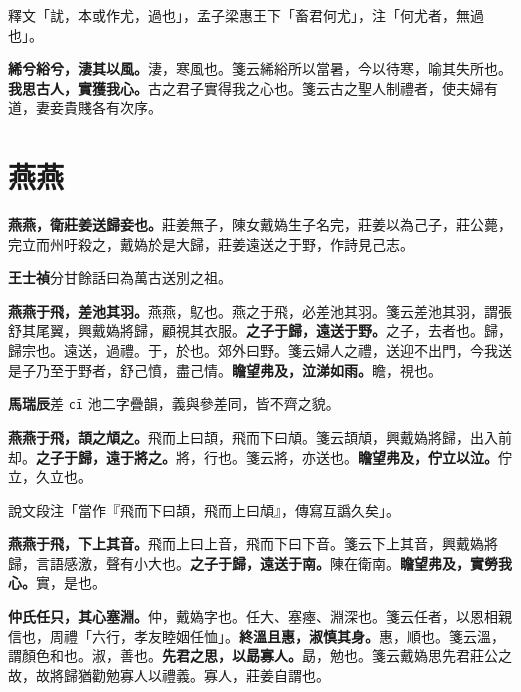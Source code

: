 \begin{quoting}釋文「訧，本或作尤，過也」，孟子梁惠王下「畜君何尤」，注「何尤者，無過也」。\end{quoting}

\textbf{絺兮綌兮，淒其以風。}{\footnotesize 淒，寒風也。箋云絺綌所以當暑，今以待寒，喻其失所也。}\textbf{我思古人，實獲我心。}{\footnotesize 古之君子實得我之心也。箋云古之聖人制禮者，使夫婦有道，妻妾貴賤各有次序。}

\section{燕燕}


\textbf{燕燕，衛莊姜送歸妾也。}{\footnotesize 莊姜無子，陳女戴媯生子名完，莊姜以為己子，莊公薨，完立而州吁殺之，戴媯於是大歸，莊姜遠送之于野，作詩見己志。}

\begin{quoting}\textbf{王士禎}分甘餘話曰為萬古送別之祖。\end{quoting}

\textbf{燕燕于飛，差池其羽。}{\footnotesize 燕燕，鳦也。燕之于飛，必差池其羽。箋云差池其羽，謂張舒其尾翼，興戴媯將歸，顧視其衣服。}\textbf{之子于歸，遠送于野。}{\footnotesize 之子，去者也。歸，歸宗也。遠送，過禮。于，於也。郊外曰野。箋云婦人之禮，送迎不出門，今我送是子乃至于野者，舒己憤，盡己情。}\textbf{瞻望弗及，泣涕如雨。}{\footnotesize 瞻，視也。}

\begin{quoting}\textbf{馬瑞辰}差 \texttt{cī} 池二字疊韻，義與參差同，皆不齊之貌。\end{quoting}

\textbf{燕燕于飛，頡之頏之。}{\footnotesize 飛而上曰頡，飛而下曰頏。箋云頡頏，興戴媯將歸，出入前却。}\textbf{之子于歸，遠于將之。}{\footnotesize 將，行也。箋云將，亦送也。}\textbf{瞻望弗及，佇立以泣。}{\footnotesize 佇立，久立也。}

\begin{quoting}說文段注「當作『飛而下曰頡，飛而上曰頏』，傳寫互譌久矣」。\end{quoting}

\textbf{燕燕于飛，下上其音。}{\footnotesize 飛而上曰上音，飛而下曰下音。箋云下上其音，興戴媯將歸，言語感激，聲有小大也。}\textbf{之子于歸，遠送于南。}{\footnotesize 陳在衛南。}\textbf{瞻望弗及，實勞我心。}{\footnotesize 實，是也。}

\textbf{仲氏任只，其心塞淵。}{\footnotesize 仲，戴媯字也。任大、塞瘞、淵深也。箋云任者，以恩相親信也，周禮「六行，孝友睦姻任恤」。}\textbf{終溫且惠，淑慎其身。}{\footnotesize 惠，順也。箋云溫，謂顏色和也。淑，善也。}\textbf{先君之思，以勗寡人。}{\footnotesize 勗，勉也。箋云戴媯思先君莊公之故，故將歸猶勸勉寡人以禮義。寡人，莊姜自謂也。}

